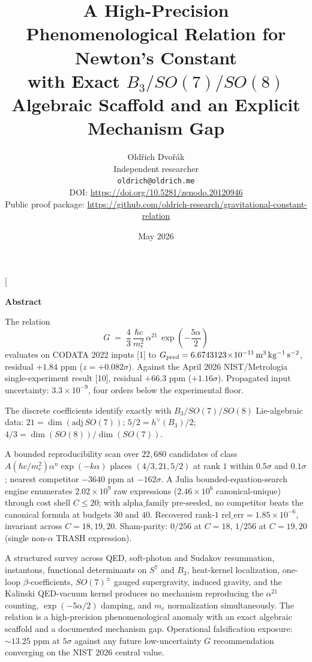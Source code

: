 \documentclass[
  11pt,
  letterpaper,
  twocolumn,
]{article}
\title{A High-Precision Phenomenological Relation for Newton's Constant\\[4pt]
\large with Exact $B_3/SO(7)/SO(8)$ Algebraic Scaffold and an Explicit Mechanism Gap}
\author{Oldřich Dvořák\\[2pt]
\small Independent researcher\\
\small \texttt{oldrich@oldrich.me}\\
\small DOI: \url{https://doi.org/10.5281/zenodo.20120946}\\
\small Public proof package: \url{https://github.com/oldrich-research/gravitational-constant-relation}}
\date{May 2026}
\begin{document}
\twocolumn[%
\maketitle

\begin{center}
\begin{minipage}{0.88\textwidth}
\setlength{\parskip}{8pt plus 2pt minus 1pt}
\setlength{\parindent}{0pt}
\begin{center}\large\textbf{Abstract}\end{center}
\vspace{2pt}

\noindent
The relation
\[\boxed{\;G \;=\; \frac{4}{3}\,\frac{\hbar c}{m_e^2}\,\alpha^{21}\,\exp\!\left(-\frac{5\alpha}{2}\right)\;}\]
evaluates on CODATA 2022 inputs {[}1{]} to
\(G_{\rm pred} = 6.6743123\!\times\!10^{-11}\,\mathrm{m^3\,kg^{-1}\,s^{-2}}\), residual \(+1.84\) ppm (\(z=+0.082\sigma\)). Against the April 2026 NIST/Metrologia single-experiment result {[}10{]}, residual \(+66.3\) ppm (\(+1.16\sigma\)). Propagated input uncertainty: \(3.3\!\times\!10^{-9}\), four orders below the experimental floor.

The discrete coefficients identify exactly with \(B_3/SO(7)/SO(8)\) Lie-algebraic data: \(21\!=\!\dim(\mathrm{adj}\,SO(7))\); \(5/2\!=\!h^\vee(B_3)/2\); \(4/3\!=\!\dim(SO(8))/\dim(SO(7))\).

A bounded reproducibility scan over \(22{,}680\) candidates of class \(A(\hbar c/m_e^2)\alpha^n\exp(-k\alpha)\) places \((4/3,21,5/2)\) at rank \(1\) within \(0.5\sigma\) and \(0.1\sigma\); nearest competitor \(-3640\) ppm at \(-162\sigma\). A Julia bounded-equation-search engine enumerates \(2.02\!\times\!10^9\) raw expressions (\(2.46\!\times\!10^6\) canonical-unique) through cost shell \(C\!\le\!20\); with \(\mathrm{alpha\_family}\) pre-seeded, no competitor beats the canonical formula at budgets \(30\) and \(40\). Recovered rank-\(1\) \(\mathrm{rel\_err}=1.85\!\times\!10^{-6}\), invariant across \(C\!=\!18,19,20\). Sham-parity: \(0/256\) at \(C\!=\!18\), \(1/256\) at \(C\!=\!19,20\) (single non-\(\alpha\) TRASH expression).

A structured survey across QED, soft-photon and Sudakov resummation, instantons, functional determinants on \(S^7\) and \(B_3\), heat-kernel localization, one-loop \(\beta\)-coefficients, \(SO(7)^\pm\) gauged supergravity, induced gravity, and the Kalinski QED-vacuum kernel produces no mechanism reproducing the \(\alpha^{21}\) counting, \(\exp(-5\alpha/2)\) damping, and \(m_e\) normalization simultaneously. The relation is a high-precision phenomenological anomaly with an exact algebraic scaffold and a documented mechanism gap. Operational falsification exposure: \(\sim\!13.25\) ppm at \(5\sigma\) against any future low-uncertainty \(G\) recommendation converging on the NIST 2026 central value.


\end{minipage}
\end{center}
\end{document}
